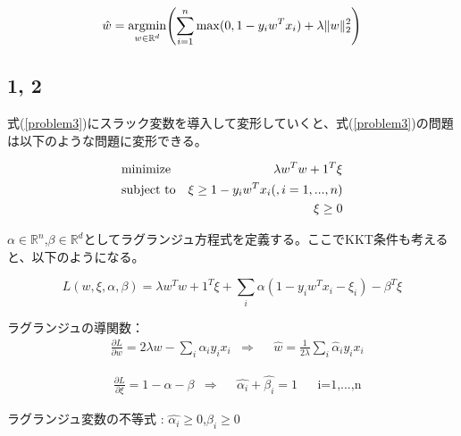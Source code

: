 \documentclass[a4j,11pt]{jarticle}
\newcommand{\argmin}{\mathop{\rm argmin}\limits}
\begin{document}
\begin{equation}
    \hat{w} = \argmin_{w\in \mathbb{R}^d} \Biggl(\sum_{i=1}^{n}\max(0,1-y_iw^Tx_i) + \lambda \|w\|^2_2 \Biggr) \label{problem3}
\end{equation}

\subsection*{1, 2}
式(\ref{problem3})にスラック変数を導入して変形していくと、式(\ref{problem3})の問題は以下のような問題に変形できる。

\begin{equation}
    \begin{aligned}
        & \text{minimize}
            & \lambda w^Tw + 1^T\xi\\
        &\text{subject to}
            & \xi \geq 1-y_iw^Tx_i \text(,i = 1,...,n)\\
            & & \xi \geq 0\\
    \end{aligned}
\end{equation}

$\alpha \in \mathbb{R}^n$,$\beta \in \mathbb{R}^d$としてラグランジュ方程式を定義する。ここでKKT条件も考えると、以下のようになる。

\begin{equation}
    L(w,\xi,\alpha,\beta) = \lambda w^Tw + 1^T\xi + \sum_{i}\alpha (1-y_iw^Tx_i-\xi_i)-\beta^T\xi
\end{equation}

ラグランジュの導関数：
\begin{equation}
    \begin{aligned}
        &\frac{\partial L}{\partial w} = 2\lambda w- \sum_i \alpha_i y_i x_i
        &\Rightarrow 
        &&\hat{w} = \frac{1}{2\lambda}\sum_i\hat{\alpha}_i y_i x_i
    \end{aligned}
\end{equation}

\begin{equation}
    \begin{aligned}
        &\frac{\partial L}{\partial \xi} = 1-\alpha-\beta
        &\Rightarrow
        &&\hat{\alpha_i} + \hat{\beta_i} = 1 
        &&\text{i=1,...,n}
    \end{aligned}
\end{equation}

ラグランジュ変数の不等式 : $\hat{\alpha_i}\geq0$,$\hat{\beta_i}\geq0$
\end{document}
